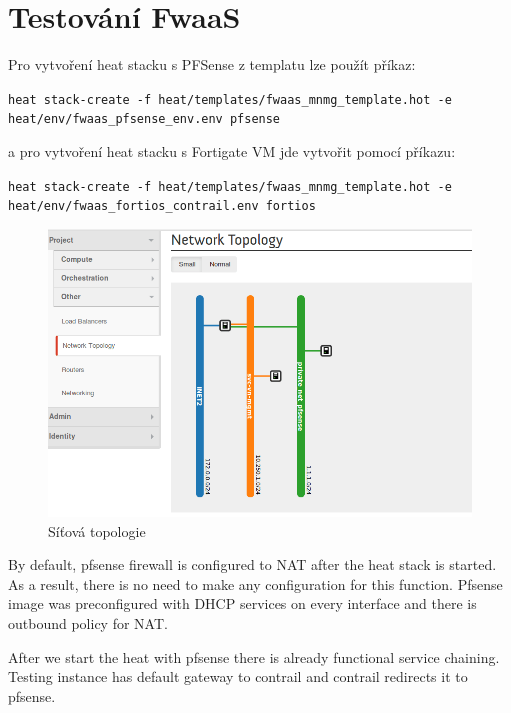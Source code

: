 \section{Testování FwaaS}\label{sub:interaction}

Pro vytvoření heat stacku s PFSense z templatu lze použít příkaz:

\verb!heat stack-create -f heat/templates/fwaas_mnmg_template.hot -e heat/env/fwaas_pfsense_env.env pfsense!

a pro vytvoření heat stacku s Fortigate VM jde vytvořit pomocí příkazu:

\verb!heat stack-create -f heat/templates/fwaas_mnmg_template.hot -e heat/env/fwaas_fortios_contrail.env fortios!


\begin{figure}[h]
\begin{centering}
\includegraphics[scale=0.45]{images/fwaas_topologie}
\par\end{centering}
\caption{Síťová topologie\label{fig:fwaas_topologie}}
\end{figure}


By default, pfsense firewall is configured to NAT after the heat stack is started. As a result, there is no need to make any configuration for this function. Pfsense image was preconfigured with DHCP services on every interface and there is outbound policy for NAT.

After we start the heat with pfsense there is already functional service chaining. Testing instance has default gateway to contrail and contrail redirects it to pfsense.

